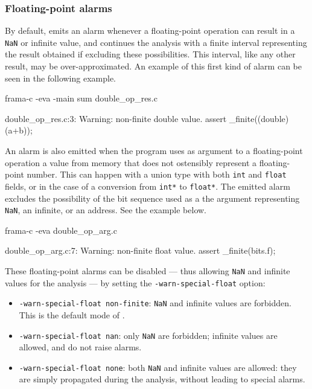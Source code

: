 \documentclass{frama-c-book}
\begin{document}
\subsubsection{Floating-point alarms}

By default, \Eva{} emits an alarm whenever a floating-point operation can result
in a \lstinline|NaN| or infinite value, and continues the analysis
with a finite interval representing the result obtained
if excluding these possibilities. This interval, like
any other result, may be over-approximated. An example of this
first kind of alarm can be seen in the following example.
\begin{frama-c-commands}
frama-c -eva -main sum double_op_res.c
\end{frama-c-commands}
\begin{logs}
 double_op_res.c:3: Warning: non-finite double value.
    assert \is_finite((double)(a+b));
\end{logs}

An alarm is also emitted when the program uses as argument to
a floating-point operation a value from memory that does not
ostensibly represent a floating-point number. This can
happen with a union type with both \lstinline|int| and
\lstinline|float| fields, or in the case of a conversion
from \lstinline|int*| to \lstinline|float*|.  The emitted alarm
excludes the possibility of the bit sequence used as a the
argument representing \lstinline|NaN|, an infinite, or an address.
See the example below.
\begin{frama-c-commands}
frama-c -eva double_op_arg.c
\end{frama-c-commands}
\begin{logs}
 double_op_arg.c:7: Warning: non-finite float value.
    assert \is_finite(bits.f);
\end{logs}

These floating-point alarms can be disabled — thus allowing \lstinline|NaN| and infinite
values for the analysis — by setting the \lstinline|-warn-special-float|
option:
\begin{itemize}
\item \texttt{-warn-special-float non-finite}: \lstinline|NaN| and infinite
  values are forbidden. This is the default mode of \Eva{}.
\item \texttt{-warn-special-float nan}: only \lstinline|NaN| are forbidden;
  infinite values are allowed, and do not raise alarms.
\item \texttt{-warn-special-float none}: both \lstinline|NaN| and infinite
  values are allowed: they are simply propagated during the analysis, without
  leading to special alarms.
\end{itemize}
\end{document}
